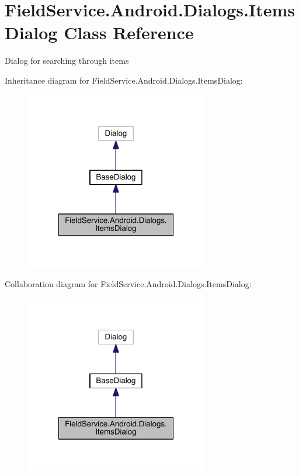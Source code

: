 \hypertarget{class_field_service_1_1_android_1_1_dialogs_1_1_items_dialog}{\section{Field\+Service.\+Android.\+Dialogs.\+Items\+Dialog Class Reference}
\label{class_field_service_1_1_android_1_1_dialogs_1_1_items_dialog}
}


Dialog for searching through items  




Inheritance diagram for Field\+Service.\+Android.\+Dialogs.\+Items\+Dialog\+:
\nopagebreak
\begin{figure}[H]
\begin{center}
\leavevmode
\includegraphics[width=226pt]{class_field_service_1_1_android_1_1_dialogs_1_1_items_dialog__inherit__graph}
\end{center}
\end{figure}


Collaboration diagram for Field\+Service.\+Android.\+Dialogs.\+Items\+Dialog\+:
\nopagebreak
\begin{figure}[H]
\begin{center}
\leavevmode
\includegraphics[width=226pt]{class_field_service_1_1_android_1_1_dialogs_1_1_items_dialog__coll__graph}
\end{center}
\end{figure}
